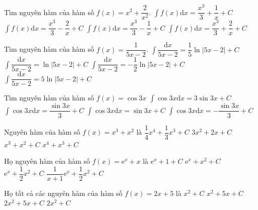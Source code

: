 \begin{ex}
	Tìm nguyên hàm của hàm số $ f(x)=x^2+\dfrac{2}{x^2}$.
	\choice
	{\True $\displaystyle\int{f(x)\mathrm{d}x}=\dfrac{x^3}{3}+\dfrac{1}{x}+C$}
	{$\displaystyle\int{f(x)\mathrm{d}x}=\dfrac{x^3}{3}-\dfrac{2}{x}+C$}
	{$\displaystyle\int{f(x)\mathrm{d}x}=\dfrac{x^3}{3}-\dfrac{1}{x}+C$}
	{$\displaystyle\int{f(x)\mathrm{d}x}=\dfrac{x^3}{3}+\dfrac{2}{x}+C$}
\end{ex}
\begin{ex}
	[Mã 110 2017]%
	Tìm nguyên hàm của hàm số $ f(x)=\dfrac{1}{5x-2}$.
	\choice
	{\True $\displaystyle\int{\dfrac{\mathrm{d}x}{5x-2}=\dfrac{1}{5}\ln\left| 5x-2\right|+C}$}
	{$\displaystyle\int{\dfrac{\mathrm{d}x}{5x-2}=\ln\left| 5x-2\right|+C}$}
	{$\displaystyle\int{\dfrac{\mathrm{d}x}{5x-2}=-\dfrac{1}{2}\ln\left| 5x-2\right|+C}$}
	{$\displaystyle\int{\dfrac{\mathrm{d}x}{5x-2}=5\ln\left| 5x-2\right|+C}$}
\end{ex}
\begin{ex}
	[Mã 123 2017]%
	Tìm nguyên hàm của hàm số $ f(x)=\cos 3x$
	\choice
	{$\displaystyle\int{\cos 3x\mathrm{d}x=3\sin 3x+C}$}
	{\True $\displaystyle\int{\cos 3x\mathrm{d}x=\dfrac{\sin 3x}{3}+C}$}
	{$\displaystyle\int{\cos 3x\mathrm{d}x=\sin 3x+C}$}
	{$\displaystyle\int{\cos 3x\mathrm{d}x=-\dfrac{\sin 3x}{3}+C}$}
\end{ex}
\begin{ex}
	[Mã 104 2018]%
	Nguyên hàm của hàm số $f(x)=x^3+x^2$ là
	\choice
	{\True $\dfrac{1}{4}{x^4}+\dfrac{1}{3}{x^3}+C$}
	{$3x^2+2x+C$}
	{$x^3+x^2+C$}
	{$x^4+x^3+C$}
	\loigiai{}
\end{ex}
\begin{ex}
	Họ nguyên hàm của hàm số $ f(x)=\mathrm{e}^x+x$ là
	\choice
	{$\mathrm{e}^x+1+C$}
	{$\mathrm{e}^x+x^2+C$}
	{\True $\mathrm{e}^x+\dfrac{1}{2}{x^2}+C$}
	{$\dfrac{1}{x+1}{\mathrm{e}^x}+\dfrac{1}{2}{x^2}+C$}
	\loigiai{}
\end{ex}
\begin{ex}
	[Mã 101 - 2019]%
	Họ tất cả các nguyên hàm của hàm số $ f(x)=2x+5$ là
	\choice
	{$x^2+C$}
	{\True $x^2+5x+C$}
	{$ 2x^2+5x+C$}
	{$ 2x^2+C$}
\end{ex}
